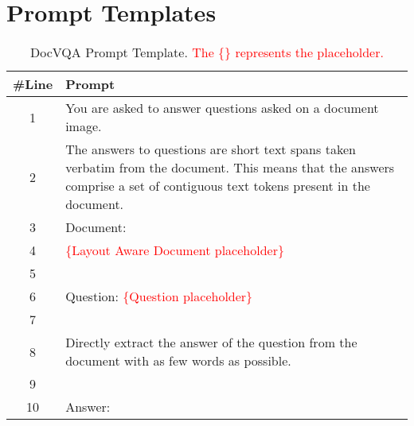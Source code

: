 \documentclass[letterpaper]{article} \usepackage{aaai24_preprint}  \usepackage{times}  \usepackage{helvet}  \usepackage{courier}  \usepackage[hyphens]{url}  \usepackage{graphicx} \urlstyle{rm} \def\UrlFont{\rm}  \usepackage{natbib}  \usepackage{caption} \frenchspacing  \setlength{\pdfpagewidth}{8.5in} \setlength{\pdfpageheight}{11in} \usepackage{algorithm}
\begin{document}


\appendix

\section{Prompt Templates}
\begin{table*}[ht]
    \small
    \centering
    \begin{tabular}{cl}
    \toprule
    \#Line& Prompt\\
    \midrule
    1& You are asked to answer questions asked on a document image.\\
    2& \parbox[c]{16cm}{
    The answers to questions are short text spans taken verbatim from the document.
    This means that the answers comprise a set of contiguous text tokens present in the document.}\\
    3& Document:\\
    4& \textcolor{red}{\{Layout Aware Document placeholder\}}\\
    5& \\
    6& Question: \textcolor{red}{\{Question placeholder\}}\\
    7&\\
    8&Directly extract the answer of the question from the document with as few words as possible.\\
    9&\\
    10&Answer:\\
    \bottomrule
\end{tabular}
\caption{DocVQA Prompt Template. \textcolor{red}{The \{\} represents the placeholder.}}
\label{tab:docvqa_prompt}
\end{table*}
\end{document}
